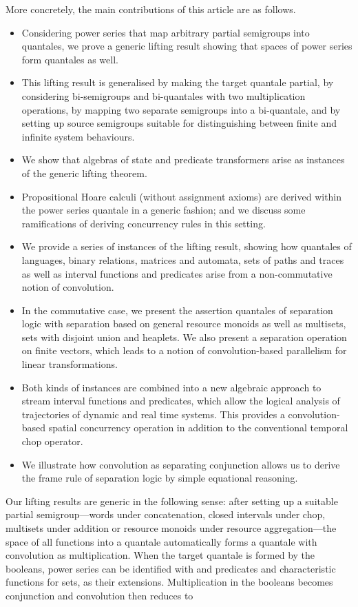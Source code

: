 \documentclass[12pt]{article}
\theoremstyle{definition}
\begin{document}
More concretely, the main contributions of this article are as
follows.
\begin{itemize}
\item Considering power series that map arbitrary partial semigroups
  into quantales, we prove a generic lifting result showing that
  spaces of power series form quantales as well.
\item This lifting result is generalised by making the target quantale
  partial, by considering bi-semigroups and bi-quantales with two
  multiplication operations, by mapping two separate semigroups into a
  bi-quantale, and by setting up source semigroups suitable for
  distinguishing between finite and infinite system behaviours.
\item We show that algebras of state and predicate transformers arise
  as instances of the generic lifting theorem.
\item Propositional Hoare calculi (without assignment axioms) are
  derived within the power series quantale in a generic fashion; and
  we discuss some ramifications of deriving concurrency rules in this
  setting.
\item We provide a series of instances of the lifting result, showing
  how quantales of languages, binary relations, matrices and automata,
  sets of paths and traces as well as interval functions and
  predicates arise from a non-commutative notion of convolution.
\item In the commutative case, we present the assertion quantales of
  separation logic with separation based on general resource monoids
  as well as multisets, sets with disjoint union and heaplets. We also
  present a separation operation on finite vectors, which leads to a
  notion of convolution-based parallelism for linear transformations.
\item Both kinds of instances are combined into a new algebraic
  approach to stream interval functions and predicates, which allow
  the logical analysis of trajectories of dynamic and real time
  systems. This provides a convolution-based spatial concurrency
  operation in addition to the conventional temporal chop operator.
\item We illustrate how convolution as separating conjunction allows
  us to derive the frame rule of separation logic by simple equational
  reasoning.
\end{itemize}

Our lifting results are generic in the following sense: after setting
up a suitable partial semigroup---words under concatenation, closed
intervals under chop, multisets under addition or resource monoids
under resource aggregation---the space of all functions into a
quantale automatically forms a quantale with convolution as
multiplication.  When the target quantale is formed by the booleans,
power series can be identified with and predicates and characteristic
functions for sets, as their extensions. Multiplication in the
booleans becomes conjunction and convolution then reduces to
\end{document}
